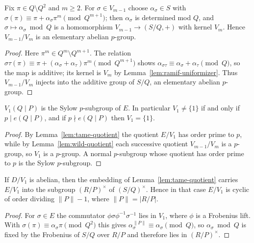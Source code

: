 \begin{lemma}
  \label{lem:wild-quotient}
  Fix $\pi \in Q \setminus Q^2$ and $m \ge 2$. For $\sigma \in V_{m-1}$ choose
  $\alpha_\sigma \in S$ with $\sigma(\pi) \equiv \pi + \alpha_\sigma \pi^m
  \pmod{Q^{m+1}}$; then $\alpha_\sigma$ is determined mod $Q$, and $\sigma
  \mapsto \alpha_\sigma \bmod Q$ is a homomorphism $V_{m-1} \to (S/Q, +)$ with
  kernel $V_m$. Hence $V_{m-1}/V_m$ is an elementary abelian $p$-group.
\end{lemma}
\begin{proof}
  Here $\pi^m \in Q^m \setminus Q^{m+1}$. The relation $\sigma\tau(\pi) \equiv
  \pi + (\alpha_\sigma + \alpha_\tau)\pi^m \pmod{Q^{m+1}}$ shows
  $\alpha_{\sigma\tau} \equiv \alpha_\sigma + \alpha_\tau \pmod{Q}$, so the map
  is additive; its kernel is $V_m$ by Lemma~\ref{lem:ramif-uniformizer}. Thus
  $V_{m-1}/V_m$ injects into the additive group of $S/Q$, an elementary abelian
  $p$-group.
\end{proof}

\begin{lemma}
  \label{lem:V1-sylow}
  $V_1(Q \mid P)$ is the Sylow $p$-subgroup of $E$. In particular $V_1 \neq
  \{1\}$ if and only if $p \mid e(Q \mid P)$, and if $p \nmid e(Q \mid P)$ then
  $V_1 = \{1\}$.
\end{lemma}
\begin{proof}
  By Lemma~\ref{lem:tame-quotient} the quotient $E/V_1$ has order prime to $p$,
  while by Lemma~\ref{lem:wild-quotient} each successive quotient $V_{m-1}/V_m$
  is a $p$-group, so $V_1$ is a $p$-group. A normal $p$-subgroup whose quotient
  has order prime to $p$ is the Sylow $p$-subgroup.
\end{proof}

\begin{lemma}
  \label{lem:inertia-abelian-residue}
  If $D/V_1$ is abelian, then the embedding of Lemma~\ref{lem:tame-quotient}
  carries $E/V_1$ into the subgroup $(R/P)^\times$ of $(S/Q)^\times$. Hence in
  that case $E/V_1$ is cyclic of order dividing $\lVert P \rVert - 1$, where
  $\lVert P \rVert = |R/P|$.
\end{lemma}
\begin{proof}
  For $\sigma \in E$ the commutator $\phi\sigma\phi^{-1}\sigma^{-1}$ lies in
  $V_1$, where $\phi$ is a Frobenius lift. With $\sigma(\pi) \equiv
  \alpha_\sigma \pi \pmod{Q^2}$ this gives $\alpha_\sigma^{\lVert P \rVert}
  \equiv \alpha_\sigma \pmod{Q}$, so $\alpha_\sigma \bmod Q$ is fixed by the
  Frobenius of $S/Q$ over $R/P$ and therefore lies in $(R/P)^\times$.
\end{proof}


